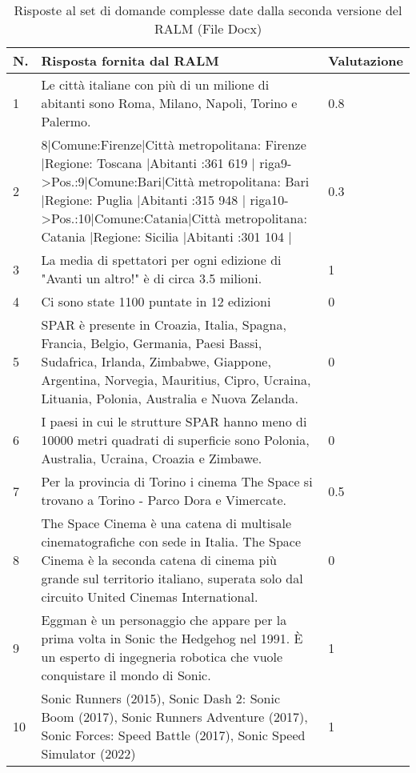 \begin{table}[H]
    \centering
    \begin{tabular}{|p{0.5cm} |p{6cm} |p{2cm}|}
        \hline
        \textbf{N}. & \textbf{Risposta fornita dal RALM} & \textbf{Valutazione} \\
        \hline
        1 & Le città italiane con più di un milione di abitanti sono Roma, Milano, Napoli, Torino e Palermo. & 0.8 \\
        \hline
        2 & 8|Comune:Firenze|Città metropolitana: Firenze |Regione: Toscana |Abitanti :361 619 | 
        riga9->Pos.:9|Comune:Bari|Città metropolitana: Bari |Regione: Puglia |Abitanti :315 948 |
        riga10->Pos.:10|Comune:Catania|Città metropolitana: Catania |Regione: Sicilia |Abitanti :301 104 | & 0.3 \\
        \hline
        3 & La media di spettatori per ogni edizione di "Avanti un altro!" è di circa 3.5 milioni. & 1 \\
        \hline
        4 & Ci sono state 1100 puntate in 12 edizioni & 0 \\
        \hline
        5 & SPAR è presente in Croazia, Italia, Spagna, Francia, Belgio, Germania, Paesi Bassi, Sudafrica, Irlanda, Zimbabwe, Giappone, Argentina, Norvegia, Mauritius, Cipro, Ucraina, Lituania, Polonia, Australia e Nuova Zelanda. & 0 \\
        \hline
        6 & I paesi in cui le strutture SPAR hanno meno di 10000 metri quadrati di superficie sono Polonia, Australia, Ucraina, Croazia e Zimbawe. & 0 \\
        \hline
        7 & Per la provincia di Torino i cinema The Space si trovano a Torino - Parco Dora e Vimercate. & 0.5 \\
        \hline
        8 & The Space Cinema è una catena di multisale cinematografiche con sede in Italia. The Space Cinema è la seconda catena di cinema più grande sul territorio italiano, superata solo dal circuito United Cinemas International. & 0 \\
        \hline
        9 & Eggman è un personaggio che appare per la prima volta in Sonic the Hedgehog nel 1991. È un esperto di ingegneria robotica che vuole conquistare il mondo di Sonic. & 1 \\
        \hline
        10 & Sonic Runners (2015), Sonic Dash 2: Sonic Boom (2017), Sonic Runners Adventure (2017), Sonic Forces: Speed Battle (2017), Sonic Speed Simulator (2022) & 1 \\
        \hline
    \end{tabular}
    \caption{Risposte al set di domande complesse date dalla seconda versione del RALM (File Docx)}
\end{table}

